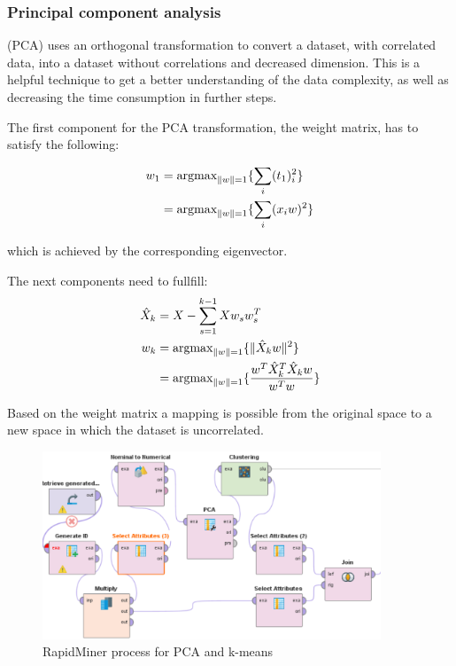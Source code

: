 \subsubsection{Principal component analysis}

(PCA) uses an orthogonal transformation to convert a dataset, with correlated data, into a dataset without correlations and decreased dimension. This is a helpful technique to get a better understanding of the data complexity, as well as decreasing the time consumption in further steps.

The first component for the PCA transformation, the weight matrix, has to satisfy the following:

\vspace*{-1em}
\begin{align*}
w_1 &= \text{argmax}_{\|w\| = 1} \{\sum_i (t_1)_i^2\}\\
	&= \text{argmax}_{\|w\| = 1} \{\sum_i (x_iw)^2\}
	\vspace*{-2em}
\end{align*}


which is achieved by the corresponding eigenvector.

The next components need to fullfill:
\begin{align*}
\hat{X}_k &= X - \sum_{s=1}^{k-1} Xw_sw_s^T\\
w_k &= \text{argmax}_{\|w\| = 1} \{\|\hat{X}_kw\|^2\}\\
	&= \text{argmax}_{\|w\| = 1} \{\frac{w^T\hat{X}_k^T\hat{X}_kw}{w^Tw}\}
	\vspace*{-1em}
\end{align*}

Based on the weight matrix a mapping is possible from the original space to a new space in which the dataset is uncorrelated. 
	
	\vspace*{-1em}
	\begin{figure}[H]
	\centering
	\includegraphics[width=0.9\textwidth]{PCAClustering}
	\caption{RapidMiner process for PCA and k-means}
	\label{fig:PCA}
	\vspace*{-2em}
	\end{figure}

